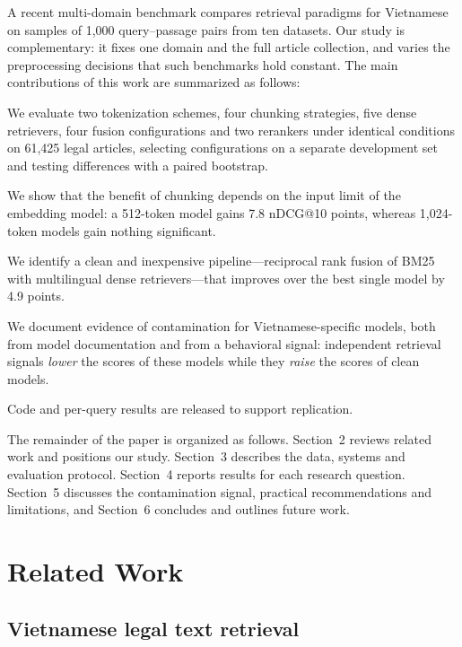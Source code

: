 \documentclass{ws-vjcs}
\begin{document}
A recent multi-domain benchmark compares retrieval paradigms for Vietnamese on samples of 1,000 query--passage pairs from ten datasets.\cite{nguyen2026vire} Our study is complementary: it fixes one domain and the full article collection, and varies the preprocessing decisions that such benchmarks hold constant. The main contributions of this work are summarized as follows:
\begin{itemlist}
\item We evaluate two tokenization schemes, four chunking strategies, five dense retrievers, four fusion configurations and two rerankers under identical conditions on 61,425 legal articles, selecting configurations on a separate development set and testing differences with a paired bootstrap.
\item We show that the benefit of chunking depends on the input limit of the embedding model: a 512-token model gains 7.8 nDCG@10 points, whereas 1,024-token models gain nothing significant.
\item We identify a clean and inexpensive pipeline---reciprocal rank fusion of BM25 with multilingual dense retrievers---that improves over the best single model by 4.9 points.
\item We document evidence of contamination for Vietnamese-specific models, both from model documentation and from a behavioral signal: independent retrieval signals \emph{lower} the scores of these models while they \emph{raise} the scores of clean models.
\end{itemlist}
Code and per-query results are released to support replication.

The remainder of the paper is organized as follows. Section~2 reviews related work and positions our study. Section~3 describes the data, systems and evaluation protocol. Section~4 reports results for each research question. Section~5 discusses the contamination signal, practical recommendations and limitations, and Section~6 concludes and outlines future work.

\section{Related Work}

\subsection{Vietnamese legal text retrieval}
\end{document}

